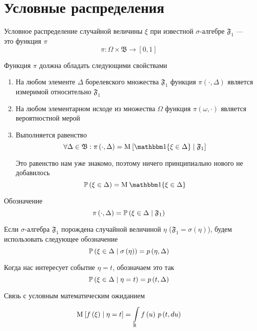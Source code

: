 \section{Условные распределения}

\begin{definition}
    Условное распределение случайной величины $\xi$
    при известной $\sigma$-алгебре $\mathfrak{F}_1$ --- это функция $\pi$
    $$\pi: \Omega \times \mathfrak{B} \rightarrow \left[ 0, 1 \right]$$
    
    Функция $\pi$ должна обладать следующими свойствами
    \begin{enumerate}
        \item На любом элементе $\Delta$ борелевского множества $\mathfrak{F}_1$
            функция $\pi\left( \cdot, \Delta \right)$ является измеримой
            относительно $\mathfrak{F}_1$
        \item На любом элементарном исходе из множества $\Omega$
            функция $\pi\left( \omega, \cdot \right)$
            является вероятностной мерой
        \item Выполняется равенство
            $$\forall \Delta \in \mathfrak{B}: \pi\left( \cdot, \Delta \right)
                = \Mean{\Indicator{\xi \in \Delta} \mcond \mathfrak{F}_1}$$

            Это равенство нам уже знакомо, поэтому ничего принципиально нового
            не добавилось
            $$\probability{\xi \in \Delta} = \mean{\Indicator{\xi \in \Delta}}$$
    \end{enumerate}

    Обозначение
    $$\pi\left( \cdot, \Delta \right)
        = \probability{\xi \in \Delta \mcond \mathfrak{F}_1}$$

    Если $\sigma$-алгебра $\mathfrak{F}_1$ порождена случайной величиной
    $\eta$ ($\mathfrak{F}_1 = \sigma\left( \eta \right)$), будем использовать
    следующее обозначение
    $$\probability{\xi \in \Delta \mcond \sigma\left( \eta \right)}
        = \pdf{\eta, \Delta}$$

    Когда нас интересует событие $\eta = t$, обозначаем это так
    $$\probability{\xi \in \Delta \mcond \eta = t} = \pdf{t, \Delta}$$

    Связь с условным математическим ожиданием
    $$\Mean{f\left( \xi \right) \mcond \eta = t}
        = \integrall{\mathbb{R}}{\pdf{t, du}}{f\left( u \right)}$$
\end{definition}

